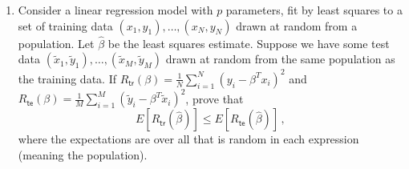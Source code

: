 \documentclass[]{book}
\theoremstyle{definition}
\newtheorem*{soln}{Solution}
\begin{document}
\begin{enumerate}
	      \begin{soln} We use the \texttt{sklearn} library of Python.
			      {\footnotesize
				      \begin{verbatim}
			Linear Regression
			Training Error
			2.48%
			Testing Error
			15.17%
			k-nearest neighbors classifier
			k = 1
			Training Error
			0.00%
			Testing Error
			2.47%
			k = 3
			Training Error
			0.50%
			Testing Error
			3.02%
			k = 5
			Training Error
			0.58%
			Testing Error
			3.02%
			k = 7
			Training Error
			0.65%
			Testing Error
			3.30%
			k = 15
			Training Error
			0.94%
			Testing Error
			3.85%
		\end{verbatim}}
	      \end{soln}

	\item Consider a linear regression model with $p$ parameters, fit by least
	      squares to a set of training data $(x_1,y_1),\ldots,(x_N,y_N)$ drawn
	      at random from a population. Let $\hat \beta$ be the least squares
	      estimate. Suppose we have some test data $(\tilde x_1, \tilde
		      y_1),\ldots,(\tilde x_M, \tilde y_M)$ drawn at random from the same
	      population as the training data. If
	      $R_\mathsf{tr}(\beta)=\frac{1}{N}\sum_{i=1}^N(y_i-\beta^T x_i)^2$ and
	      $R_\mathsf{te}(\beta)=\frac{1}{M}\sum_{i=1}^M(\tilde y_i-\beta^T
		      \tilde x_i)^2$, prove that $$E\left[R_\mathsf{tr}(\hat\beta)\right]\le
		      E\left[R_\mathsf{te}(\hat\beta)\right]\,,$$ where the expectations are
	      over all that is random in each expression (meaning the population).


\end{enumerate}
\end{document}
